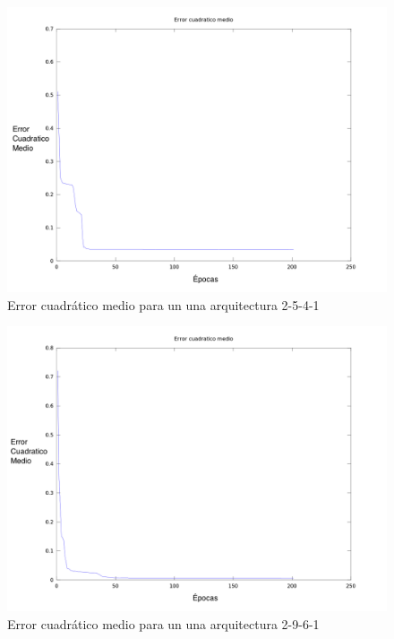 \documentclass[11pt]{article}
\begin{document}
        \begin{figure}[htbp]
        	\centering
				\includegraphics[width=1.0\textwidth]{img/5-4-1/ecm.png}
			\caption{Error cuadrático medio para un una arquitectura 2-5-4-1}
			\label{fig:541}
		\end{figure}
        
        \begin{figure}[htbp]
            \centering
				\includegraphics[width=1.0\textwidth]{img/9-6-1/ecm.png}
			\caption{Error cuadrático medio para un una arquitectura 2-9-6-1}
			\label{fig:961}
		\end{figure}
        
\end{document}
